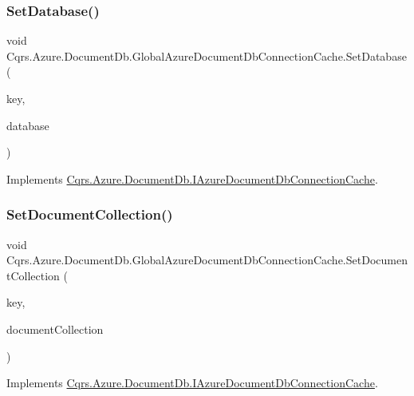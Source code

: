 \subsubsection{\texorpdfstring{Set\+Database()}{SetDatabase()}}
{\footnotesize\ttfamily void Cqrs.\+Azure.\+Document\+Db.\+Global\+Azure\+Document\+Db\+Connection\+Cache.\+Set\+Database (\begin{DoxyParamCaption}\item[{string}]{key,  }\item[{Database}]{database }\end{DoxyParamCaption})}



Implements \hyperlink{interfaceCqrs_1_1Azure_1_1DocumentDb_1_1IAzureDocumentDbConnectionCache_a9242c99ffb76f8ad9b15cab617056bf0_a9242c99ffb76f8ad9b15cab617056bf0}{Cqrs.\+Azure.\+Document\+Db.\+I\+Azure\+Document\+Db\+Connection\+Cache}.

\mbox{\label{classCqrs_1_1Azure_1_1DocumentDb_1_1GlobalAzureDocumentDbConnectionCache_a19c4bcbf0149036557fb8a3a3b687c79_a19c4bcbf0149036557fb8a3a3b687c79}} 
\subsubsection{\texorpdfstring{Set\+Document\+Collection()}{SetDocumentCollection()}}
{\footnotesize\ttfamily void Cqrs.\+Azure.\+Document\+Db.\+Global\+Azure\+Document\+Db\+Connection\+Cache.\+Set\+Document\+Collection (\begin{DoxyParamCaption}\item[{string}]{key,  }\item[{Document\+Collection}]{document\+Collection }\end{DoxyParamCaption})}



Implements \hyperlink{interfaceCqrs_1_1Azure_1_1DocumentDb_1_1IAzureDocumentDbConnectionCache_a6f5dab93f2ebee2503eb808b9031777d_a6f5dab93f2ebee2503eb808b9031777d}{Cqrs.\+Azure.\+Document\+Db.\+I\+Azure\+Document\+Db\+Connection\+Cache}.

